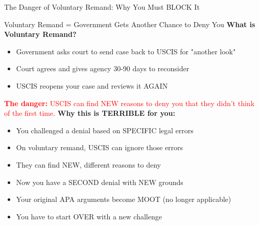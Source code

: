 \documentclass[11pt]{beamer}
\begin{document}
	\begin{frame}{The Danger of Voluntary Remand: Why You Must BLOCK It}
		\scriptsize
		\begin{block}{Voluntary Remand = Government Gets Another Chance to Deny You}
			\textbf{What is Voluntary Remand?}
			\begin{itemize}
				\item Government asks court to send case back to USCIS for "another look"
				\item Court agrees and gives agency 30-90 days to reconsider
				\item USCIS reopens your case and reviews it AGAIN
			\end{itemize}
			\textcolor{red}{\textbf{The danger:} USCIS can find NEW reasons to deny you that they didn't think of the first time.}
			\vspace{0.2cm}
			\textbf{Why this is TERRIBLE for you:}
			\begin{itemize}
				\item You challenged a denial based on SPECIFIC legal errors
				\item On voluntary remand, USCIS can ignore those errors
				\item They can find NEW, different reasons to deny
				\item Now you have a SECOND denial with NEW grounds
				\item Your original APA arguments become MOOT (no longer applicable)
				\item You have to start OVER with a new challenge
			\end{itemize}
		\end{block}
	\end{frame}
	
\end{document}
